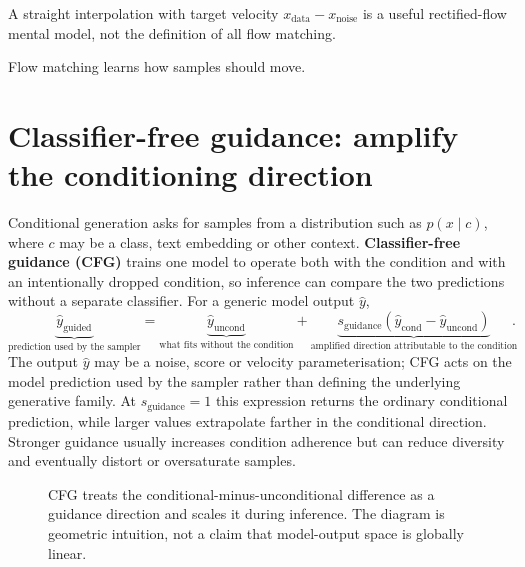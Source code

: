 \begin{calloutspecialcase}
A straight interpolation with target velocity $x_{\text{data}}-x_{\text{noise}}$ is a useful rectified-flow mental model, not the definition of all flow matching.
\end{calloutspecialcase}

\begin{calloutmemoryhook}
Flow matching learns how samples should move.
\end{calloutmemoryhook}

\section{Classifier-free guidance: amplify the conditioning direction}

Conditional generation asks for samples from a distribution such as $p(x\mid c)$, where $c$ may be a class, text embedding or other context.
\textbf{Classifier-free guidance (CFG)} trains one model to operate both with the condition and with an intentionally dropped condition, so inference can compare the two predictions without a separate classifier.
For a generic model output $\hat y$,
\[
\boxed{
\underbrace{\hat y_{\text{guided}}}_{\text{prediction used by the sampler}}
=
\underbrace{\hat y_{\text{uncond}}}_{\text{what fits without the condition}}
+
\underbrace{s_{\text{guidance}}
\left(\hat y_{\text{cond}}-\hat y_{\text{uncond}}\right)}_{\text{amplified direction attributable to the condition}}
}.
\]
The output $\hat y$ may be a noise, score or velocity parameterisation; CFG acts on the model prediction used by the sampler rather than defining the underlying generative family.
At $s_{\text{guidance}}=1$ this expression returns the ordinary conditional prediction, while larger values extrapolate farther in the conditional direction.
Stronger guidance usually increases condition adherence but can reduce diversity and eventually distort or oversaturate samples.

\begin{figure}[H]
\centering
{}
\caption{CFG treats the conditional-minus-unconditional difference as a guidance direction and scales it during inference. The diagram is geometric intuition, not a claim that model-output space is globally linear.}
\label{fig:cfg-vector}
\end{figure}

